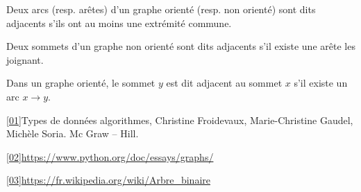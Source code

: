 \begin{defi}[Adjacence]
Deux arcs (resp. arêtes) d'un graphe orienté (resp. non orienté) sont dits adjacents s'ils ont au moins une extrémité commune. 

Deux sommets d'un graphe non orienté sont dits adjacents s'il existe une arête les joignant. 

Dans un graphe orienté, le sommet $y$ est dit adjacent au sommet $x$ s'il existe un arc $x\to y$.
\end{defi}

\begin{defi}[Sommet -- n\oe{}ud]

\end{defi}

\begin{defi}[Arc]

\end{defi}


\begin{defi}[Arête]

\end{defi}


\begin{defi}[Boucle]

\end{defi}


\begin{defi}

\end{defi}



\begin{defi}

\end{defi}


\begin{defi}[Cycle]

\end{defi}


\begin{defi}

\end{defi}







\ref{01}{Types de données algorithmes, Christine Froidevaux, Marie-Christine Gaudel, Michèle Soria. Mc Graw -- Hill.}

\ref{02}{\url{https://www.python.org/doc/essays/graphs/}}

\ref{03}{\url{https://fr.wikipedia.org/wiki/Arbre_binaire}}
